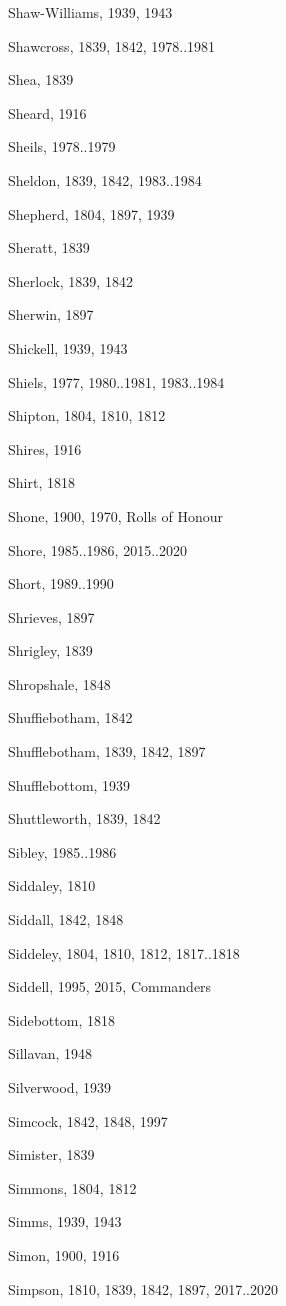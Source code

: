 \begin{theindex}
\item Shaw-Williams, 1939, 1943
\item Shawcross, 1839, 1842, 1978..1981
\item Shea, 1839
\item Sheard, 1916
\item Sheils, 1978..1979
\item Sheldon, 1839, 1842, 1983..1984
\item Shepherd, 1804, 1897, 1939
\item Sheratt, 1839
\item Sherlock, 1839, 1842
\item Sherwin, 1897
\item Shickell, 1939, 1943
\item Shiels, 1977, 1980..1981, 1983..1984
\item Shipton, 1804, 1810, 1812
\item Shires, 1916
\item Shirt, 1818
\item Shone, 1900, 1970, Rolls of Honour
\item Shore, 1985..1986, 2015..2020
\item Short, 1989..1990
\item Shrieves, 1897
\item Shrigley, 1839
\item Shropshale, 1848
\item Shuffiebotham, 1842
\item Shufflebotham, 1839, 1842, 1897
\item Shufflebottom, 1939
\item Shuttleworth, 1839, 1842
\item Sibley, 1985..1986
\item Siddaley, 1810
\item Siddall, 1842, 1848
\item Siddeley, 1804, 1810, 1812, 1817..1818
\item Siddell, 1995, 2015, Commanders
\item Sidebottom, 1818
\item Sillavan, 1948
\item Silverwood, 1939
\item Simcock, 1842, 1848, 1997
\item Simister, 1839
\item Simmons, 1804, 1812
\item Simms, 1939, 1943
\item Simon, 1900, 1916
\item Simpson, 1810, 1839, 1842, 1897, 2017..2020

\end{theindex}
